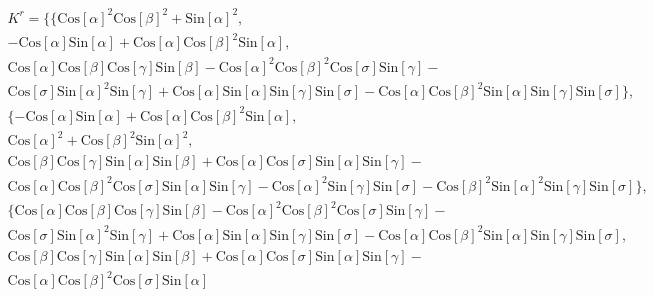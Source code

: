 \documentclass[12pt]{report}
\begin{document}
\begin{multline}
  \label{eq:41}
  K^r = \{\{\text{Cos}[\alpha ]^2 \text{Cos}[\beta
      ]^2+\text{Sin}[\alpha ]^2,\\
      -\text{Cos}[\alpha ] \text{Sin}[\alpha
      ]+\text{Cos}[\alpha ] \text{Cos}[\beta ]^2 \text{Sin}[\alpha
      ],\\
      \text{Cos}[\alpha ] \text{Cos}[\beta ] \text{Cos}[\gamma ]
      \text{Sin}[\beta ]-\text{Cos}[\alpha ]^2 \text{Cos}[\beta ]^2
      \text{Cos}[\sigma ] \text{Sin}[\gamma ]-\\
      \text{Cos}[\sigma ]
      \text{Sin}[\alpha ]^2 \text{Sin}[\gamma ]+
      \text{Cos}[\alpha ]
      \text{Sin}[\alpha ] \text{Sin}[\gamma ] \text{Sin}[\sigma
      ]-\text{Cos}[\alpha ] \text{Cos}[\beta ]^2 \text{Sin}[\alpha ]
      \text{Sin}[\gamma ] \text{Sin}[\sigma
      ]\},\\
      \{-\text{Cos}[\alpha ] \text{Sin}[\alpha
      ]+\text{Cos}[\alpha ] \text{Cos}[\beta ]^2 \text{Sin}[\alpha
      ],\\
      \text{Cos}[\alpha ]^2+\text{Cos}[\beta ]^2 \text{Sin}[\alpha
      ]^2,\\
      \text{Cos}[\beta ] \text{Cos}[\gamma ] \text{Sin}[\alpha ]
      \text{Sin}[\beta ]+\text{Cos}[\alpha ] \text{Cos}[\sigma ]
      \text{Sin}[\alpha ] \text{Sin}[\gamma ]-\\
      \text{Cos}[\alpha ]
      \text{Cos}[\beta ]^2 \text{Cos}[\sigma ] \text{Sin}[\alpha ]
      \text{Sin}[\gamma ]-\text{Cos}[\alpha ]^2 \text{Sin}[\gamma ]
      \text{Sin}[\sigma ]-\text{Cos}[\beta ]^2 \text{Sin}[\alpha ]^2
      \text{Sin}[\gamma ] \text{Sin}[\sigma
      ]\},\\
      \{\text{Cos}[\alpha ] \text{Cos}[\beta ]
      \text{Cos}[\gamma ] \text{Sin}[\beta ]-\text{Cos}[\alpha ]^2
      \text{Cos}[\beta ]^2 \text{Cos}[\sigma ] \text{Sin}[\gamma
      ]-\\
      \text{Cos}[\sigma ] \text{Sin}[\alpha ]^2 \text{Sin}[\gamma
      ]+\text{Cos}[\alpha ] \text{Sin}[\alpha ] \text{Sin}[\gamma ]
      \text{Sin}[\sigma ]-\text{Cos}[\alpha ] \text{Cos}[\beta ]^2
      \text{Sin}[\alpha ] \text{Sin}[\gamma ] \text{Sin}[\sigma
      ],\\
      \text{Cos}[\beta ] \text{Cos}[\gamma ] \text{Sin}[\alpha ]
      \text{Sin}[\beta ]+\text{Cos}[\alpha ] \text{Cos}[\sigma ]
      \text{Sin}[\alpha ] \text{Sin}[\gamma ]-\\
      \text{Cos}[\alpha ]
      \text{Cos}[\beta ]^2 \text{Cos}[\sigma ] \text{Sin}[\alpha ]

\end{multline}
\end{document}

